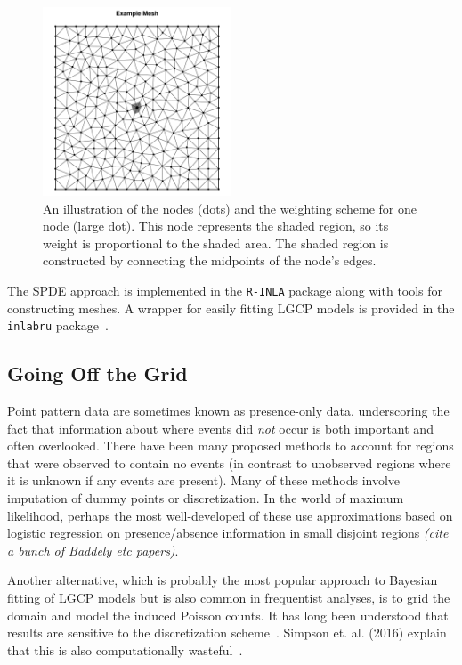 \documentclass[]{interact}
\begin{document}
\begin{figure}[h]\centering
\includegraphics[width=0.5\textwidth]{figures/dual.pdf}
\caption{An illustration of the nodes (dots) and the weighting scheme for one
node (large dot). This node represents the shaded region, so its weight is
proportional to the shaded area. The shaded region is constructed by connecting
the midpoints of the node's edges.}
\label{dual}
\end{figure}

The SPDE approach is implemented in the \texttt{R-INLA} package along with
tools for constructing meshes. A wrapper for easily fitting LGCP models is
provided in the \texttt{inlabru} package~\cite{inlabru}.


\subsection{Going Off the Grid}

Point pattern data are sometimes known as presence-only data, underscoring
the fact that information about where events did \emph{not} occur is both
important and often overlooked. There have been many proposed methods to
account for regions that were observed to contain no events (in contrast to
unobserved regions where it is unknown if any events are present). Many of
these methods involve imputation of dummy points or discretization. In the
world of maximum likelihood, perhaps the most well-developed of these use
approximations based on logistic regression on presence/absence information in
small disjoint regions {\it (cite a bunch of Baddely etc papers)}.

Another alternative, which is probably the most popular approach to Bayesian
fitting of LGCP models but is also common in frequentist analyses, is to grid
the domain and model the induced Poisson counts. It has long been understood
that results are sensitive to the discretization scheme~\cite{brixmoeller}.
Simpson et. al. (2016) explain that this is also computationally
wasteful~\cite{simpsonetal}.
\end{document}

